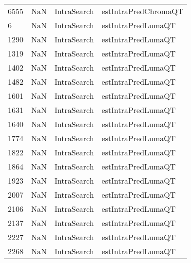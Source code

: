 \begin{tabular}{llll}
6555 &                   NaN &                IntraSearch &                      estIntraPredChromaQT \\
6    &                   NaN &                IntraSearch &                        estIntraPredLumaQT \\
1290 &                   NaN &                IntraSearch &                        estIntraPredLumaQT \\
1319 &                   NaN &                IntraSearch &                        estIntraPredLumaQT \\
1402 &                   NaN &                IntraSearch &                        estIntraPredLumaQT \\
1482 &                   NaN &                IntraSearch &                        estIntraPredLumaQT \\
1601 &                   NaN &                IntraSearch &                        estIntraPredLumaQT \\
1631 &                   NaN &                IntraSearch &                        estIntraPredLumaQT \\
1640 &                   NaN &                IntraSearch &                        estIntraPredLumaQT \\
1774 &                   NaN &                IntraSearch &                        estIntraPredLumaQT \\
1822 &                   NaN &                IntraSearch &                        estIntraPredLumaQT \\
1864 &                   NaN &                IntraSearch &                        estIntraPredLumaQT \\
1923 &                   NaN &                IntraSearch &                        estIntraPredLumaQT \\
2007 &                   NaN &                IntraSearch &                        estIntraPredLumaQT \\
2106 &                   NaN &                IntraSearch &                        estIntraPredLumaQT \\
2137 &                   NaN &                IntraSearch &                        estIntraPredLumaQT \\
2227 &                   NaN &                IntraSearch &                        estIntraPredLumaQT \\
2268 &                   NaN &                IntraSearch &                        estIntraPredLumaQT \\

\end{tabular}
